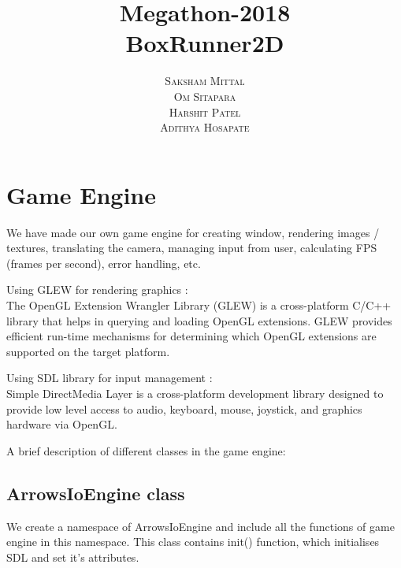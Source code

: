 \documentclass{article}
\begin{document}
\title
{\Huge \textbf{Megathon-2018}\\ 
\huge BoxRunner2D }
\author{\textsc{Saksham Mittal} \\ 
\textsc{Om Sitapara} \\
\textsc{Harshit Patel} \\
\textsc{Adithya Hosapate}\\}

\maketitle
\vspace{350px}

\tableofcontents{}
\vspace{400px}

\section{Game Engine}
We have made our own game engine for creating window, rendering images / textures, translating the camera, managing input from user, calculating FPS (frames per second), error handling, etc. \newline

Using GLEW for rendering graphics : \\
The OpenGL Extension Wrangler Library (GLEW) is a cross-platform C/C++ library that helps in querying and loading OpenGL extensions. GLEW provides efficient run-time mechanisms for determining which OpenGL extensions are supported on the target platform. \newline

Using SDL library for input management : \\
Simple DirectMedia Layer is a cross-platform development library designed to provide low level access to audio, keyboard, mouse, joystick, and graphics hardware via OpenGL.
\newline

A brief description of different classes in the game engine:


\subsection{ArrowsIoEngine class}
We create a namespace of ArrowsIoEngine and include all the functions of game engine in this namespace. This class contains init() function, which initialises SDL and set it’s attributes. \newline
\end{document}
